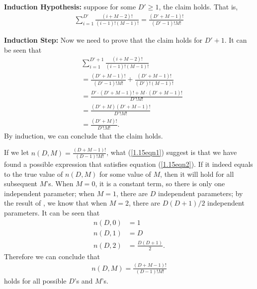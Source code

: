 \begin{answer}{}
	\noindent\textbf{Induction Hypothesis:} suppose for some $D' \geq 1$, the claim holds. That is,
	\begin{align}
		\sum_{i = 1}^{D'} \frac{(i + M - 2)!}{(i - 1)!(M - 1)!} = \frac{(D' + M - 1)!}{(D'-1)!M!}
	\end{align}
	
	\noindent\textbf{Induction Step:} Now we need to prove that the claim holds for $D' + 1$. It can be seen that
	\begin{align}
		&\sum_{i=1}^{D'+1} \frac{(i + M - 2)!}{(i - 1)!(M - 1)!}\\
		&= \frac{(D' + M - 1)!}{(D'-1)!M!} + \frac{(D'+M-1)!}{(D')!(M-1)!}\\
		&= \frac{D'\cdot (D' + M - 1)! + M \cdot (D'+M-1)!}{D'!M!}\\
		&= \frac{(D' + M)(D' + M - 1)!}{D'!M!}\\
		&= \frac{(D' + M)!}{D'!M!}.
	\end{align}
	By induction, we can conclude that the claim holds.
	
	If we let $n(D, M) = \frac{(D + M - 1)!}{(D-1)!M!}$, what (\ref{1.15eqn1}) suggest is that we have found a possible expression that satisfies equation (\ref{1.15eqn2}). If it indeed equals to the true value of $n(D, M)$ for some value  of $M$, then it will hold for all subsequent $M$'s. When $M = 0$, it is a constant term, so there is only one independent parameter; when $M = 1$, there are $D$ independent parameters; by the result of , we know that when $M = 2$, there are $D(D+1)/2$ independent parameters. It can be seen that
	\begin{align}
		n(D, 0) &= 1\\
		n(D, 1) &= D\\
		n(D, 2) &= \frac{D(D+1)}{2}.
	\end{align}
	Therefore we can conclude that
	\begin{align}
		n(D, M) = \frac{(D + M - 1)!}{(D-1)!M!}
	\end{align}
	holds for all possible $D$'s and $M$'s.
\end{answer}